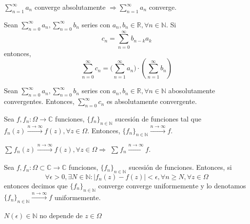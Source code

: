 \begin{obs}
  $\sum_{n = 1}^{\infty} a_{n}$ converge absolutamente $\Rightarrow \sum_{n = 1}^{\infty} a_{n}$ converge.
\end{obs}

\begin{prop}
  Sean $\sum_{n = 0}^{\infty} a_{n}, \sum_{n = 0}^{\infty} b_{n}$ series con $a_{n}, b_{n} \in \mathbb{R}, \forall n \in \mathbb{N}$. Si
  \[ 
    c_{n} = \sum_{n = 0}^{\infty} b_{n -k} a_{k}
  \] 
  entonces,
  \[ 
    \sum_{n = 0}^{\infty} c_{n} = \big ( \sum_{n = 1}^{\infty} a_{n} \big ) \cdot ( \sum_{n = 1}^{\infty} b_{n} )
  \] 
\end{prop}

\begin{prop}
  Sean $\sum_{n = 0}^{\infty} a_{n}, \sum_{n = 0}^{\infty} b_{n}$ series con $a_{n}, b_{n} \in \mathbb{R}, \forall n \in \mathbb{N}$ abosolutamente convergentes. Entonces, $\sum_{n = 0}^{\infty} c_{n}$ es absolutamente convergente.
\end{prop}

\begin{defn}
  Sea $f, f_{n}: \Omega \to \mathbb{C}$ funciones, $\{ f_{n} \}_{n \in \mathbb{N}}$ sucesión de funciones tal que $f_{n}(z) \xrightarrow[]{ n \rightarrow \infty } f(z), \forall z \in \Omega$. Entonces, $\{ f_{n} \}_{n \in \mathbb{N}} \xrightarrow[]{ n \rightarrow \infty } f$.
\end{defn}

\begin{obs}
  $\sum_{}^{} f_{n}(z) \xrightarrow[]{ n \rightarrow \infty } f(z), \forall z \in \Omega \Rightarrow$ $\sum_{}^{} f_{n} \xrightarrow[]{ n \rightarrow  \infty } f$.
\end{obs}

\begin{defn}
  Sea $f,f_{n}: \Omega \subset \mathbb{C} \to \mathbb{C}$ funciones, $\{ f_{n} \}_{n \in \mathbb{N}}$ sucesión de funciones. Entonces, si
  \[ 
    \forall \epsilon >0, \exists N \in \mathbb{N}: | f_{n}(z) - f(z) | < \epsilon, \forall n \geq N, \forall z \in \Omega 
  \] 
  entonces decimos que $\{ f_{n} \}_{n \in \mathbb{N}}$ converge converge uniformemente y lo denotamos $\{ f_{n} \}_{n \in \mathbb{N}} \xrightarrow[]{ n \rightarrow \infty } f$ uniformemente.
\end{defn}

\begin{obs}
  $N(\epsilon) \in \mathbb{N}$ no depende de $z \in \Omega$
\end{obs}

